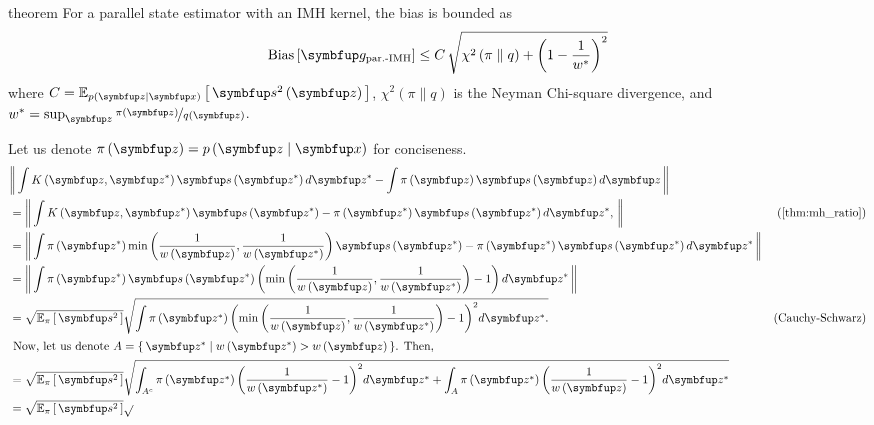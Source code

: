 
\begin{theoremEnd}{theorem}
  For a parallel state estimator with an IMH kernel, the bias is bounded as
  \[
  \mathrm{Bias}\left[ \vg_{\text{par.-IMH}} \right] \leq 
  C \, \sqrt{
    \chi^2\left( \pi \parallel q \right)
    +
    {\left(
      1 - \frac{1}{w^*}
      \right)}^2
  }
  \]
  where \(C = \Esub{p\left(\vz\mid\vx\right)}{\vs^2\left(\vz\right)}\), \(\chi^2\left(\pi \parallel q \right)\) is the Neyman Chi-square divergence, and \(w^* = \sup_{\vz} \nicefrac{\pi\left(\vz\right)}{q\left(\vz\right)} \).
\end{theoremEnd}
\begin{proofEnd}
  Let us denote \(\pi\left(\vz\right) = p\left(\vz\mid\vx\right)\) for conciseness.
  \begin{align}
    &\norm{
      \int K\left(\vz, \vz^*\right) \vs\left(\vz^*\right) d\vz^*
      - \int \pi\left(\vz\right) \vs\left(\vz\right) d\vz 
    }
    \\
    &=
    \norm{
      \int K\left(\vz, \vz^*\right) \vs\left(\vz^*\right) 
      - \pi\left(\vz^*\right) \vs\left(\vz^*\right) d\vz^*,
    }
    &\text{(\cref{thm:mh_ratio})}
    \\
    &=
    \norm{
      \int \pi\left(\vz^*\right) \min\left(\frac{1}{w\left(\vz\right)}, \frac{1}{w\left(\vz^*\right)}\right)  \vs\left(\vz^*\right) 
      - \pi\left(\vz^*\right) \vs\left(\vz^*\right) d\vz^*
    }
    \\
    &=
    \norm{
      \int \pi\left(\vz^*\right) \vs\left(\vz^*\right)
      \left(
      \min\left(\frac{1}{w\left(\vz\right)}, \frac{1}{w\left(\vz^*\right)}\right)  - 1  
      \right)
      d\vz^*
    }
    \\
    &=
    \sqrt{
      \Esub{\pi}{\vs^2}
    }
    \sqrt{
      \int \pi\left(\vz^*\right)
      {\left(
      \min\left(\frac{1}{w\left(\vz\right)}, \frac{1}{w\left(\vz^*\right)}\right)  - 1  
      \right)}^2
      d\vz^*.
    }
    &\text{(Cauchy-Schwarz)}
    \\
    \intertext{
     Now, let us denote \(A = \{\, \vz^* \mid w\left(\vz^*\right) > w\left(\vz\right) \,\}\).
     Then,
    }
    &=
    \sqrt{
      \Esub{\pi}{\vs^2}
    }
    \sqrt{
      \int_{A^c} \pi\left(\vz^*\right)
      {\left(
      \frac{1}{w\left(\vz^*\right)}  - 1  
      \right)}^2
      d\vz^*
      +
      \int_{A} \pi\left(\vz^*\right)
      {\left(
      \frac{1}{w\left(\vz\right)}  - 1  
      \right)}^2
      d\vz^*
    } \\
    &=
    \sqrt{
      \Esub{\pi}{\vs^2}
    }
    \sqrt{
}
\end{align}
\end{proofEnd}

